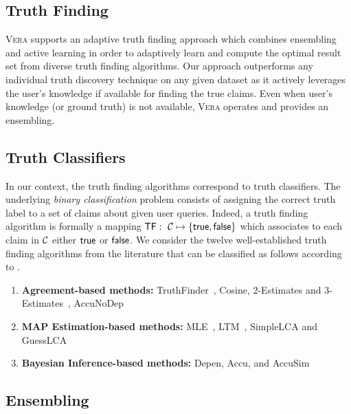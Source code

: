 \subsection{Truth Finding}\label{truthfinding}
{\scshape Vera} supports an adaptive truth finding approach which combines ensembling and active learning in order to 
adaptively learn and compute the optimal result set from diverse truth finding algorithms. Our approach outperforms any individual truth discovery technique on any given dataset as it actively leverages the user's knowledge if available for finding the true claims. Even when user's knowledge (or ground truth) is not available, {\scshape Vera} operates and provides an ensembling.

\subsection{Truth Classifiers}
In our context, the truth finding algorithms correspond to truth classifiers. The underlying \emph{binary classification} 
problem consists of assigning the correct truth label to a set of claims about given user queries. Indeed, a truth finding 
algorithm is formally a mapping $\textsf{TF}:~\mathcal{C} \mapsto \{\mathsf{true}, \mathsf{false}\}$ which associates to each claim in $\mathcal{C}$
either $\mathsf{true}$ or $\mathsf{false}$. We  consider the twelve well-established truth finding algorithms from  the literature that can be classified as follows according to \cite{}.

\begin{enumerate}
 \item \textbf{Agreement-based methods:} TruthFinder~\cite{YinHY08}, Cosine, 2-Estimates and 3-Estimates~\cite{GallandAMS10}, 
 AccuNoDep~\cite{DongBS09}
 \item \textbf{MAP Estimation-based methods:} MLE~\cite{WangKLA12}, LTM~\cite{ZhaoRGH12}, SimpleLCA and GuessLCA~\cite{PasternackR13}
 \item \textbf{Bayesian Inference-based methods:} Depen, Accu, and AccuSim~\cite{DongBS09}
\end{enumerate}



\subsection{Ensembling}\label{ensembling}
\medskip


